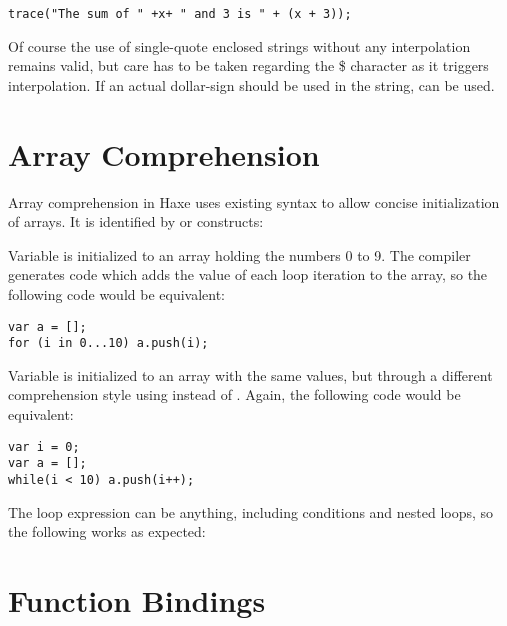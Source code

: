 \documentclass{haxe}
\begin{document}
\begin{lstlisting}
trace("The sum of " +x+ " and 3 is " + (x + 3));
\end{lstlisting}
Of course the use of single-quote enclosed strings without any interpolation remains valid, but care has to be taken regarding the \$ character as it triggers interpolation. If an actual dollar-sign should be used in the string, \expr{\$\$} can be used.



\section{Array Comprehension}
\label{lf-array-comprehension}

Array comprehension in Haxe uses existing syntax to allow concise initialization of arrays. It is identified by \expr{[for} or \expr{[while} constructs:


Variable  is initialized to an array holding the numbers 0 to 9. The compiler generates code which adds the value of each loop iteration to the array, so the following code would be equivalent:

\begin{lstlisting}
var a = [];
for (i in 0...10) a.push(i);
\end{lstlisting}

Variable  is initialized to an array with the same values, but through a different comprehension style using  instead of . Again, the following code would be equivalent:

\begin{lstlisting}
var i = 0;
var a = [];
while(i < 10) a.push(i++);
\end{lstlisting}

The loop expression can be anything, including conditions and nested loops, so the following works as expected:



\section{Function Bindings}
\label{lf-function-bindings}
\end{document}
